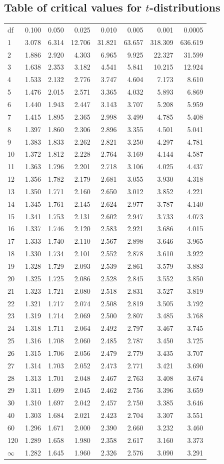 \documentclass[11pt,a4paper,openany]{book}
\begin{document}
\newpage

\subsection{\texorpdfstring{Table of critical values for
\(t\)-distributions}{Table of critical values for t-distributions}}\label{s-disttables-t}

\begin{longtable}[]{@{}lrrrrrrr@{}}
\toprule
df & 0.100 & 0.050 & 0.025 & 0.010 & 0.005 & 0.001 &
0.0005\tabularnewline
1 & 3.078 & 6.314 & 12.706 & 31.821 & 63.657 & 318.309 &
636.619\tabularnewline
2 & 1.886 & 2.920 & 4.303 & 6.965 & 9.925 & 22.327 &
31.599\tabularnewline
3 & 1.638 & 2.353 & 3.182 & 4.541 & 5.841 & 10.215 &
12.924\tabularnewline
4 & 1.533 & 2.132 & 2.776 & 3.747 & 4.604 & 7.173 & 8.610\tabularnewline
5 & 1.476 & 2.015 & 2.571 & 3.365 & 4.032 & 5.893 & 6.869\tabularnewline
6 & 1.440 & 1.943 & 2.447 & 3.143 & 3.707 & 5.208 & 5.959\tabularnewline
7 & 1.415 & 1.895 & 2.365 & 2.998 & 3.499 & 4.785 & 5.408\tabularnewline
8 & 1.397 & 1.860 & 2.306 & 2.896 & 3.355 & 4.501 & 5.041\tabularnewline
9 & 1.383 & 1.833 & 2.262 & 2.821 & 3.250 & 4.297 & 4.781\tabularnewline
10 & 1.372 & 1.812 & 2.228 & 2.764 & 3.169 & 4.144 &
4.587\tabularnewline
11 & 1.363 & 1.796 & 2.201 & 2.718 & 3.106 & 4.025 &
4.437\tabularnewline
12 & 1.356 & 1.782 & 2.179 & 2.681 & 3.055 & 3.930 &
4.318\tabularnewline
13 & 1.350 & 1.771 & 2.160 & 2.650 & 3.012 & 3.852 &
4.221\tabularnewline
14 & 1.345 & 1.761 & 2.145 & 2.624 & 2.977 & 3.787 &
4.140\tabularnewline
15 & 1.341 & 1.753 & 2.131 & 2.602 & 2.947 & 3.733 &
4.073\tabularnewline
16 & 1.337 & 1.746 & 2.120 & 2.583 & 2.921 & 3.686 &
4.015\tabularnewline
17 & 1.333 & 1.740 & 2.110 & 2.567 & 2.898 & 3.646 &
3.965\tabularnewline
18 & 1.330 & 1.734 & 2.101 & 2.552 & 2.878 & 3.610 &
3.922\tabularnewline
19 & 1.328 & 1.729 & 2.093 & 2.539 & 2.861 & 3.579 &
3.883\tabularnewline
20 & 1.325 & 1.725 & 2.086 & 2.528 & 2.845 & 3.552 &
3.850\tabularnewline
21 & 1.323 & 1.721 & 2.080 & 2.518 & 2.831 & 3.527 &
3.819\tabularnewline
22 & 1.321 & 1.717 & 2.074 & 2.508 & 2.819 & 3.505 &
3.792\tabularnewline
23 & 1.319 & 1.714 & 2.069 & 2.500 & 2.807 & 3.485 &
3.768\tabularnewline
24 & 1.318 & 1.711 & 2.064 & 2.492 & 2.797 & 3.467 &
3.745\tabularnewline
25 & 1.316 & 1.708 & 2.060 & 2.485 & 2.787 & 3.450 &
3.725\tabularnewline
26 & 1.315 & 1.706 & 2.056 & 2.479 & 2.779 & 3.435 &
3.707\tabularnewline
27 & 1.314 & 1.703 & 2.052 & 2.473 & 2.771 & 3.421 &
3.690\tabularnewline
28 & 1.313 & 1.701 & 2.048 & 2.467 & 2.763 & 3.408 &
3.674\tabularnewline
29 & 1.311 & 1.699 & 2.045 & 2.462 & 2.756 & 3.396 &
3.659\tabularnewline
30 & 1.310 & 1.697 & 2.042 & 2.457 & 2.750 & 3.385 &
3.646\tabularnewline
40 & 1.303 & 1.684 & 2.021 & 2.423 & 2.704 & 3.307 &
3.551\tabularnewline
60 & 1.296 & 1.671 & 2.000 & 2.390 & 2.660 & 3.232 &
3.460\tabularnewline
120 & 1.289 & 1.658 & 1.980 & 2.358 & 2.617 & 3.160 &
3.373\tabularnewline
\(\infty\) & 1.282 & 1.645 & 1.960 & 2.326 & 2.576 & 3.090 &
3.291\tabularnewline
\bottomrule
\end{longtable}
\end{document}
